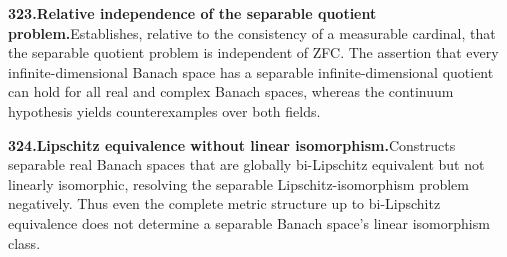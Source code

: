 \documentclass[11pt,a4paper]{article}
\begin{document}
  \par \begin{minipage}{\linewidth}
  \fontsize{10.5}{12.6}\selectfont\RaggedRight
  \hypertarget{result 323}{}
  {\bfseries\textcolor{muted}{323.}\enspace Relative independence of the separable quotient problem.}\enspace Establishes, relative to the consistency of a measurable cardinal, that the separable quotient problem is independent of ZFC. The assertion that every infinite-dimensional Banach space has a separable infinite-dimensional quotient can hold for all real and complex Banach spaces, whereas the continuum hypothesis yields counterexamples over both fields.\par
  \end{minipage}\par\vspace{5pt}



  \par \begin{minipage}{\linewidth}
  \fontsize{10.5}{12.6}\selectfont\RaggedRight
  \hypertarget{result 324}{}
  {\bfseries\textcolor{muted}{324.}\enspace Lipschitz equivalence without linear isomorphism.}\enspace Constructs separable real Banach spaces that are globally bi-Lipschitz equivalent but not linearly isomorphic, resolving the separable Lipschitz-isomorphism problem negatively. Thus even the complete metric structure up to bi-Lipschitz equivalence does not determine a separable Banach space's linear isomorphism class.\par
  \end{minipage}\par\vspace{5pt}
\end{document}
